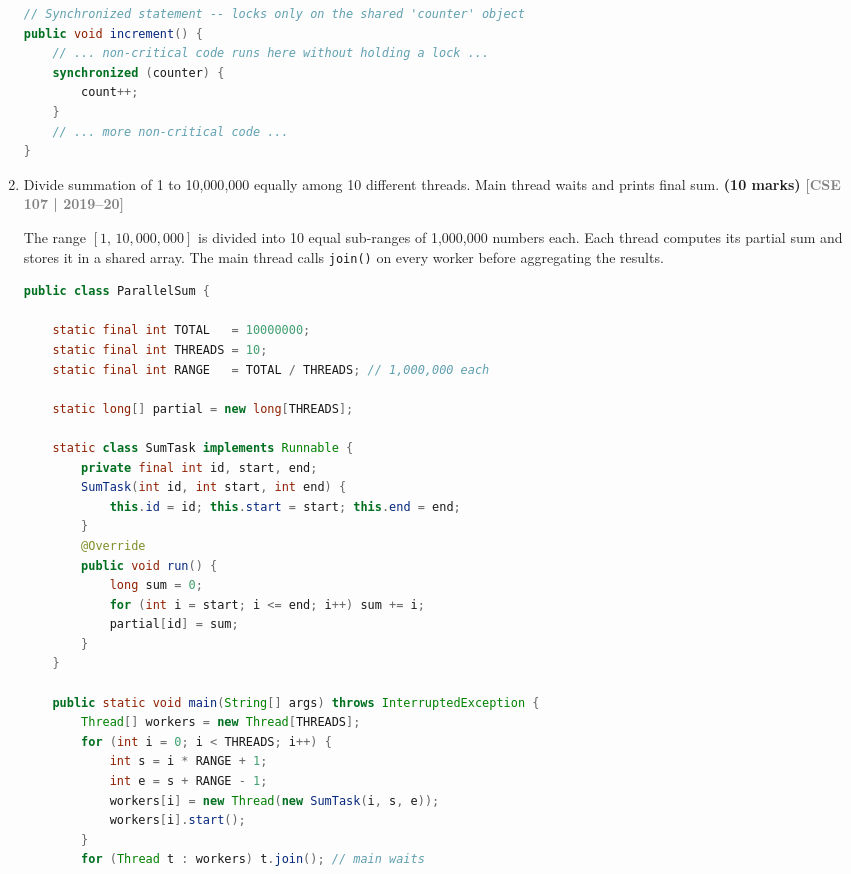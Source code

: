 \documentclass[12pt,a3paper]{article}
\newcommand{\yr}[1]{\hfill\textcolor{gray}{\small\textbf{[#1]}}}
\newcommand{\mk}[1]{\textcolor{orange!70!black}{\small\textbf{(#1 marks)}}}
\begin{document}
\begin{enumerate}
\begin{tcolorbox}
\begin{lstlisting}[language=Java]
// Synchronized statement -- locks only on the shared 'counter' object
public void increment() {
    // ... non-critical code runs here without holding a lock ...
    synchronized (counter) {
        count++;
    }
    // ... more non-critical code ...
}
\end{lstlisting}

\end{tcolorbox}

\item Divide summation of 1 to 10{,}000{,}000 equally among 10 different threads. Main thread waits and prints final sum. \mk{10}
\yr{CSE 107 | 2019--20}

\begin{tcolorbox}[enhanced,breakable,ansbox,
  colback=cF!4,colframe=cF,boxrule=0.8pt,arc=5pt,
  title={\textbf{Answer --- Summation of 1 to 10{,}000{,}000 Using 10 Threads}},
  fonttitle=\bfseries\color{white},colbacktitle=cF]

The range $[1,\,10{,}000{,}000]$ is divided into 10 equal sub-ranges
of 1{,}000{,}000 numbers each.  Each thread computes its partial sum
and stores it in a shared array.  The main thread calls
\texttt{join()} on every worker before aggregating the results.

\begin{lstlisting}[language=Java]
public class ParallelSum {

    static final int TOTAL   = 10000000;
    static final int THREADS = 10;
    static final int RANGE   = TOTAL / THREADS; // 1,000,000 each

    static long[] partial = new long[THREADS];

    static class SumTask implements Runnable {
        private final int id, start, end;
        SumTask(int id, int start, int end) {
            this.id = id; this.start = start; this.end = end;
        }
        @Override
        public void run() {
            long sum = 0;
            for (int i = start; i <= end; i++) sum += i;
            partial[id] = sum;
        }
    }

    public static void main(String[] args) throws InterruptedException {
        Thread[] workers = new Thread[THREADS];
        for (int i = 0; i < THREADS; i++) {
            int s = i * RANGE + 1;
            int e = s + RANGE - 1;
            workers[i] = new Thread(new SumTask(i, s, e));
            workers[i].start();
        }
        for (Thread t : workers) t.join(); // main waits


\end{lstlisting}
\end{tcolorbox}
\end{enumerate}
\end{document}
